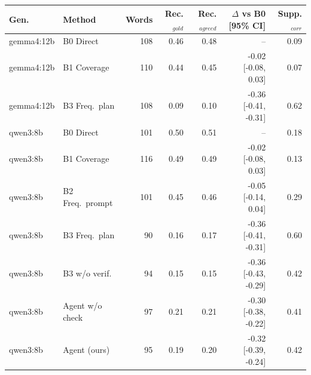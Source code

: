 \begin{tabular}{llrrrrr}
\toprule
Gen. & Method & Words & Rec.$_{gold}$ & Rec.$_{agreed}$ & $\Delta$ vs B0 [95\% CI] & Supp.$_{corr}$ \\
\midrule
gemma4:12b & B0 Direct & 108 & 0.46 & 0.48 & -- & 0.09 \\
gemma4:12b & B1 Coverage & 110 & 0.44 & 0.45 & -0.02 [-0.08, 0.03] & 0.07 \\
gemma4:12b & B3 Freq.\ plan & 108 & 0.09 & 0.10 & -0.36 [-0.41, -0.31] & 0.62 \\
qwen3:8b & B0 Direct & 101 & 0.50 & 0.51 & -- & 0.18 \\
qwen3:8b & B1 Coverage & 116 & 0.49 & 0.49 & -0.02 [-0.08, 0.03] & 0.13 \\
qwen3:8b & B2 Freq.\ prompt & 101 & 0.45 & 0.46 & -0.05 [-0.14, 0.04] & 0.29 \\
qwen3:8b & B3 Freq.\ plan & 90 & 0.16 & 0.17 & -0.36 [-0.41, -0.31] & 0.60 \\
qwen3:8b & B3 w/o verif. & 94 & 0.15 & 0.15 & -0.36 [-0.43, -0.29] & 0.42 \\
qwen3:8b & Agent w/o check & 97 & 0.21 & 0.21 & -0.30 [-0.38, -0.22] & 0.41 \\
qwen3:8b & Agent (ours) & 95 & 0.19 & 0.20 & -0.32 [-0.39, -0.24] & 0.42 \\
\bottomrule
\end{tabular}